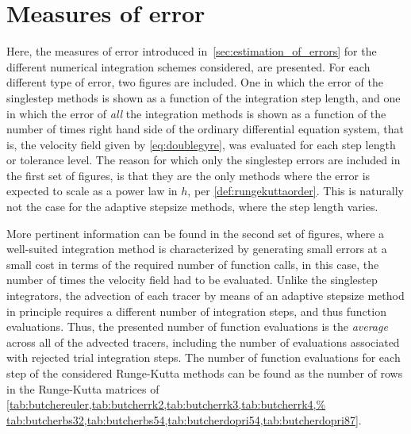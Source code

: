 \section{Measures of error}
\label{sec:measures_of_error}

Here, the measures of error introduced in~\cref{sec:estimation_of_errors} for
the different numerical integration schemes considered, are presented. For
each different type of error, two figures are included. One in which the error
of the singlestep methods is shown as a function of the integration step length,
and one in which the error of \emph{all} the integration methods is shown
as a function of the number of times right hand side of the ordinary
differential equation system, that is, the velocity field given by
\cref{eq:doublegyre}, was evaluated for each step length or tolerance level.
The reason for which only the singlestep errors are included in the first set of
figures, is that they are the only methods where the error is expected to scale
as a power law in $h$, per \cref{def:rungekuttaorder}. This is naturally not the
case for the adaptive stepsize methods, where the step length varies.

More pertinent information can be found in the second set of figures, where
a well-suited integration method is characterized by generating small
errors at a small cost in terms of the required number of function calls,
in this case, the number of times the velocity field had to be evaluated.
Unlike the singlestep integrators, the advection of each tracer by means
of an adaptive stepsize method in principle requires a different number of
integration steps, and thus function evaluations. Thus, the presented number of
function evaluations is the \emph{average} across all of the advected tracers,
including the number of evaluations associated with rejected trial integration
steps. The number of function evaluations for each step of the considered
Runge-Kutta methods can be found as the number of rows in the Runge-Kutta
matrices of
\cref{tab:butchereuler,tab:butcherrk2,tab:butcherrk3,tab:butcherrk4,%
tab:butcherbs32,tab:butcherbs54,tab:butcherdopri54,tab:butcherdopri87}.



